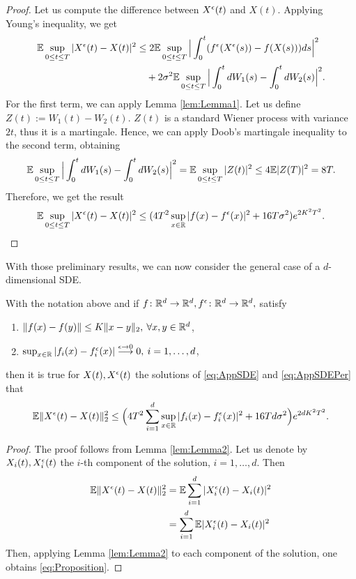 \begin{proof} Let us compute the difference between $X^\epsilon(t)$ and $X(t)$. Applying Young's inequality, we get
\begin{equation*}
\begin{aligned}
	\mathbb{E} \sup_{0 \leq t \leq T} |X^\epsilon(t) - X(t)|^2 &\leq 2\mathbb{E} \sup_{0 \leq t \leq T}\Big|\int_0^t (f^\epsilon (X^\epsilon(s)) - f(X(s)))ds \Big|^2 \\
		&\quad + 2\sigma^2 \mathbb{E} \sup_{0 \leq t \leq T} \Big|\int_0^t dW_1(s) - \int_0^t dW_2(s)  \Big|^2.
\end{aligned}
\end{equation*}
For the first term, we can apply Lemma \ref{lem:Lemma1}. Let us define $Z(t) := W_1(t) - W_2(t)$. $Z(t)$ is a standard Wiener process with variance $2t$, thus it is a martingale. Hence, we can apply Doob's martingale inequality to the second term, obtaining
\begin{equation*}
	\mathbb{E} \sup_{0 \leq t \leq T} \Big|\int_0^t dW_1(s) - \int_0^t dW_2(s)  \Big|^2 = \mathbb{E} \sup_{0 \leq t \leq T} | Z(t) |^2 \leq 4 \mathbb{E} |Z(T)|^2 = 8T.
\end{equation*}
Therefore, we get the result
\begin{equation*}
	\mathbb{E} \sup_{0 \leq t \leq T} |X^\epsilon(t) - X(t)|^2 \leq (4T^2 \sup_{x\in \mathbb{R}}|f(x) - f^\epsilon(x)|^2 + 16T\sigma^2) e^{2K^2T^2}.
\end{equation*}
\end{proof}
\noindent With those preliminary results, we can now consider the general case of a $d$-dimensional SDE.
\begin{theorem}\label{th:Prop} With the notation above and if $f\colon \mathbb{R}^d \rightarrow \mathbb{R}^d, f^\epsilon\colon \mathbb{R}^d \rightarrow \mathbb{R}^d,$ satisfy
\begin{enumerate}
	\item $\|f(x) - f(y)\| \leq K\|x - y\|_2, \: \forall x,y \in \mathbb{R}^d$,
 	\item $\sup_{x\in \mathbb{R}}|f_i(x) - f_i^\epsilon(x)| \stackrel{\epsilon \rightarrow 0}\longrightarrow 0, \: i = 1, \dots, d$,
\end{enumerate}
then it is true for $X(t), X^\epsilon(t)$ the solutions of \eqref{eq:AppSDE} and \eqref{eq:AppSDEPer} that 
\begin{equation}\label{eq:Proposition}
	\mathbb{E} \| X^\epsilon(t) - X(t) \|_2^2 \leq \Big(4T^2 \sum_{i=1}^d \sup_{x\in \mathbb{R}}|f_i(x) - f_i^\epsilon(x)|^2 + 16Td\sigma^2\Big)e^{2dK^2T^2}.
\end{equation}
\end{theorem}
\begin{proof} The proof follows from Lemma \ref{lem:Lemma2}. Let us denote by $X_i(t), X_i^\epsilon(t)$ the $i$-th component of the solution, $i = 1, \dots, d$. Then
\begin{equation*}
\begin{aligned}
	\mathbb{E}\|X^\epsilon(t) - X(t)\|_2^2  &= \mathbb{E} \sum_{i=1}^d |X_i^\epsilon(t) - X_i(t)|^2 \\
		&= \sum_{i=1}^d \mathbb{E}|X_i^\epsilon(t) - X_i(t)|^2 \\
\end{aligned}
\end{equation*}
Then, applying Lemma \ref{lem:Lemma2} to each component of the solution, one obtains \eqref{eq:Proposition}.
\end{proof}

